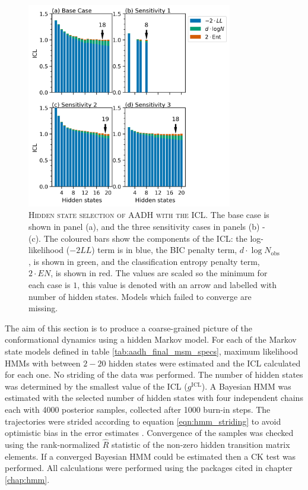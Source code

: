 \begin{figure}
    \centering
    \includegraphics[width=0.8\textwidth]{chapters/aadh/figures/aadh_h_state_selection.png}
    \caption[Hidden state selection of AADH with the ICL]{\textsc{Hidden state selection of AADH with the ICL}. The base case is shown in panel (a), and the three sensitivity cases  in panels (b) - (c).  The coloured bars show the components of the ICL: the log-likelihood ($-2LL$) term is in blue, the BIC penalty term,  $d\cdot\log{N_{\mathrm{obs}}}$, is shown in green, and the classification entropy penalty term, $2\cdot EN$, is shown in red. The values are scaled so the minimum for each case is $1$, this value is denoted with an arrow and labelled  with number of hidden states. Models which failed to converge are missing.}
    \label{fig:aadh_h_selection_results}
\end{figure}

The aim of this section is to produce a coarse-grained picture of the conformational dynamics using a hidden Markov model. For each of the Markov state models defined in table \ref{tab:aadh_final_msm_specs}, maximum likelihood HMMs with between $2 - 20$ hidden states were estimated and the ICL calculated for each one. No striding of the data was performed. The number of hidden states was determined by the smallest value of the ICL ($g^{\mathrm{ICL}}$). A Bayesian HMM was estimated with the selected number of hidden states with four independent chains each with \num{4000} posterior samples, collected after \num{1000} burn-in steps. The trajectories were strided according to equation \ref{eqn:hmm_striding} to avoid optimistic bias in the error estimates \cite{trendelkamp-schroerEstimationUncertaintyReversible2015b}. Convergence of the samples was checked using the rank-normalized $\hat{R}$ statistic \cite{vehtariRanknormalizationFoldingLocalization2020} of the non-zero hidden transition matrix elements. If a converged Bayesian HMM could be estimated then a CK test was performed. All calculations were performed using the packages cited in chapter \ref{chap:hmm}. 

